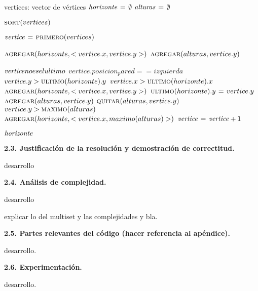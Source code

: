 \begin{codebox}
\li \Comment vertices: vector de vértices
\li $\id{horizonte} \gets \emptyset$
\li $\id{alturas} \gets \emptyset$

\li $\textnormal{\scshape sort}(vertices)$

\li $\id{vertice} \gets \proc{primero}(vertices)$


\li $\textnormal{\scshape agregar}(horizonte, <vertice.x, vertice.y>)$
\li $\textnormal{\scshape agregar}(alturas, vertice.y)$


\li \While $\id{vertice} no es el ultimo$
      \Do
\li     \If $vertice.posicion_pared == izquierda$
          \Then
\li         \If $vertice.y > \textnormal{\scshape ultimo}(horizonte).y$
              \Then
\li             \If $vertice.x > \textnormal{\scshape ultimo}(horizonte).x$
                  \Then
\li                 $\textnormal{\scshape agregar}(horizonte, <vertice.x, vertice.y>)$
\li               \Else
\li                 $\textnormal{\scshape ultimo}(horizonte).y \mathrel{\hspace{1pt}=\hspace{1pt}} vertice.y$
                 \End
              \End
\li         $\textnormal{\scshape agregar}(alturas, vertice.y)$
\li       \Else
\li         $\textnormal{\scshape quitar}(alturas, vertice.y)$
\li         \If $vertice.y > \textnormal{\scshape maximo}(alturas)$
              \Then
\li             $\textnormal{\scshape agregar}(horizonte, <vertice.x, maximo(alturas)>)$
              \End
          \End
\li     $\id{vertice} \gets \id{vertice} + 1$
      \End

\li \Return $\id{horizonte}$
\end{codebox}


\vspace*{0.75cm} \noindent


\noindent
\textbf{2.3. Justificación de la resolución y demostración de correctitud.}

\vspace*{0.3cm}

desarrollo



\vspace*{0.75cm} \noindent



\noindent
\textbf{2.4. Análisis de complejidad.}

\vspace*{0.3cm}



desarrollo


explicar lo del multiset y las complejidades y bla.


\vspace*{0.75cm} \noindent



\noindent
\textbf{2.5. Partes relevantes del código (hacer referencia al apéndice).}

\vspace*{0.3cm}

desarrollo.


\vspace*{0.75cm} \noindent



\noindent
\textbf{2.6. Experimentación.}

\vspace*{0.3cm}

desarrollo.
